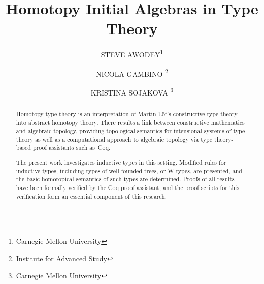 \documentclass[11pt]{article}
\theoremstyle{definition}
\begin{document}


\title{Homotopy Initial Algebras in Type Theory}
\author{STEVE AWODEY\thanks{Carnegie Mellon University}
\and NICOLA GAMBINO
\thanks{Institute for Advanced Study}
\and KRISTINA SOJAKOVA
\thanks{Carnegie Mellon University}
}


%

\begin{abstract}
Homotopy type theory is an interpretation of Martin-L\"of's constructive type theory into abstract homotopy theory.   There results a link between constructive mathematics and algebraic topology, providing topological semantics for intensional systems of type theory as well as a computational approach to algebraic topology via type theory-based proof assistants such as~Coq.

The present work investigates inductive types in this setting. Modified rules for inductive types, including types of well-founded trees, or W-types, are presented, and the basic homotopical semantics of such types are determined.  Proofs of all results have been formally verified by the Coq proof assistant, and the proof scripts for this verification form an essential component of this research.      
\end{abstract}











\end{document}
